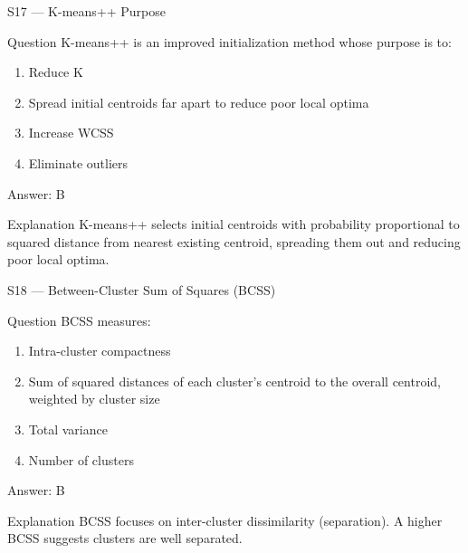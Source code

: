 \documentclass[aspectratio=169,8pt]{beamer}
\begin{document}
	\begin{frame}{S17 --- K-means++ Purpose}
		\begin{block}{Question}
			K-means++ is an improved initialization method whose purpose is to:
			\begin{enumerate}
				\item Reduce K
				\item Spread initial centroids far apart to reduce poor local optima
				\item Increase WCSS
				\item Eliminate outliers
			\end{enumerate}
		\end{block}
		\begin{exampleblock}{Answer: B}\end{exampleblock}
		\begin{block}{Explanation}
			K-means++ selects initial centroids with probability proportional to squared distance from nearest existing centroid, spreading them out and reducing poor local optima.
		\end{block}
	\end{frame}
	
	\begin{frame}{S18 --- Between-Cluster Sum of Squares (BCSS)}
		\begin{block}{Question}
			BCSS measures:
			\begin{enumerate}
				\item Intra-cluster compactness
				\item Sum of squared distances of each cluster's centroid to the overall centroid, weighted by cluster size
				\item Total variance
				\item Number of clusters
			\end{enumerate}
		\end{block}
		\begin{exampleblock}{Answer: B}\end{exampleblock}
		\begin{block}{Explanation}
			BCSS focuses on inter-cluster dissimilarity (separation). A higher BCSS suggests clusters are well separated.
		\end{block}
	\end{frame}
	
\end{document}
